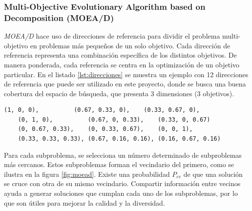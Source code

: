 \subsubsection{Multi-Objective Evolutionary Algorithm based on Decomposition (MOEA/D)}
\label{ch:moead}

\textit{MOEA/D} hace uso de direcciones de referencia para dividir el problema multi-objetivo en problemas más pequeños de un solo objetivo. Cada dirección de referencia representa una combinación específica de los distintos objetivos. De manera ponderada, cada referencia se centra en la optimización de un objetivo particular. En el listado \ref{lst:direcciones} se muestra un ejemplo con 12 direcciones de referencia que puede ser utilizado en este proyecto, donde se busca una buena cobertura del espacio de búsqueda, que presenta 3 dimensiones (3 objetivos).

\begin{small}
\begin{lstlisting}[basicstyle=\ttfamily, caption=Direcciones de referencia.,label={lst:direcciones}]
    (1, 0, 0),          (0.67, 0.33, 0),    (0.33, 0.67, 0),
    (0, 1, 0),          (0.67, 0, 0.33),    (0.33, 0, 0.67)
    (0, 0.67, 0.33),    (0, 0.33, 0.67),    (0, 0, 1),
    (0.33, 0.33, 0.33), (0.67, 0.16, 0.16), (0.16, 0.67, 0.16)
\end{lstlisting}
\end{small}

Para cada subproblema, se selecciona un número determinado de subproblemas más cercanos. Estos subproblemas forman el vecindario del primero, como se ilustra en la figura \ref{fig:moead}. Existe una probabilidad \( P_{cv} \) de que una solución se cruce con otra de su mismo vecindario. Compartir información entre vecinos ayuda a generar soluciones que cumplan cada uno de los subproblemas, por lo que son útiles para mejorar la calidad y la diversidad.~\cite{moead_pymoo}

